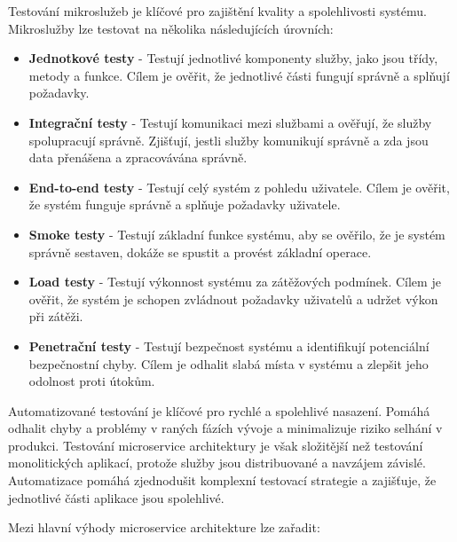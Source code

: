 
Testování mikroslužeb je klíčové pro zajištění kvality a spolehlivosti systému. Mikroslužby lze testovat na několika následujících úrovních: \cite{Richardson2018} \cite{Newman2015}

\begin{itemize}
    \item \textbf{Jednotkové testy} - Testují jednotlivé komponenty služby, jako jsou třídy, metody a funkce. Cílem je ověřit, že jednotlivé části fungují správně a splňují požadavky.
    \item \textbf{Integrační testy} - Testují komunikaci mezi službami a ověřují, že služby spolupracují správně. Zjišťují, jestli služby komunikují správně a zda jsou data přenášena a zpracovávána správně.
    \item \textbf{End-to-end testy} - Testují celý systém z pohledu uživatele. Cílem je ověřit, že systém funguje správně a splňuje požadavky uživatele.
    \item \textbf{Smoke testy} - Testují základní funkce systému, aby se ověřilo, že je systém správně sestaven, dokáže se spustit a provést základní operace.
    \item \textbf{Load testy} - Testují výkonnost systému za zátěžových podmínek. Cílem je ověřit, že systém je schopen zvládnout požadavky uživatelů a udržet výkon při zátěži.
    \item \textbf{Penetrační testy} - Testují bezpečnost systému a identifikují potenciální bezpečnostní chyby. Cílem je odhalit slabá místa v systému a zlepšit jeho odolnost proti útokům.
\end{itemize}

Automatizované testování je klíčové pro rychlé a spolehlivé nasazení. Pomáhá odhalit chyby a problémy v raných fázích vývoje a minimalizuje riziko selhání v produkci. Testování microservice architektury je však složitější než testování monolitických aplikací, protože služby jsou distribuované a navzájem závislé. Automatizace pomáhá zjednodušit komplexní testovací strategie a zajišťuje, že jednotlivé části aplikace jsou spolehlivé. 


Mezi hlavní výhody microservice architekture lze zařadit:

